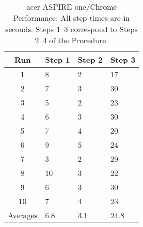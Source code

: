 \begin{table}
  \begin{center}
  \begin{tabular}{| c | l | l | l |}
    \hline
    Run          & Step 1 & Step 2 & Step 3 \\ \hline
    1            & 8      & 2      & 17     \\ \hline
    2            & 7      & 3      & 30     \\ \hline
    3            & 5      & 2      & 23     \\ \hline
    4            & 6      & 3      & 30     \\ \hline
    5            & 7      & 4      & 20     \\ \hline
    6            & 9      & 5      & 24     \\ \hline
    7            & 3      & 2      & 29     \\ \hline
    8            & 10     & 3      & 22     \\ \hline
    9            & 6      & 3      & 30     \\ \hline
    10           & 7      & 4      & 23     \\ \hline
    Averages     & 6.8    & 3.1    & 24.8   \\
    \hline
  \end{tabular}
  \caption{acer ASPIRE one/Chrome Performance:  All step times are in seconds. Steps 1--3 correspond to Steps 2--4 of the Procedure.}
  \label{aspChrPerf}
  \end{center}
\end{table}
